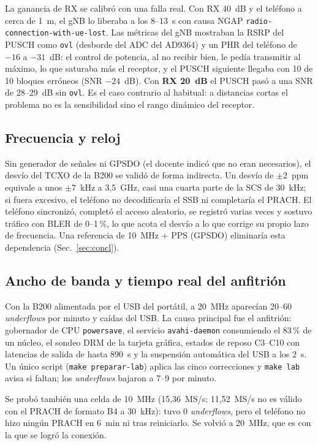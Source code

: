 \documentclass[conference]{IEEEtran}
\begin{document}
La ganancia de RX se calibró con una falla real. Con RX 40~dB y el teléfono a cerca de 1~m, el gNB lo liberaba a los 8--13~s con causa NGAP \texttt{radio-connection-with-ue-lost}. Las métricas del gNB mostraban la RSRP del PUSCH como \texttt{ovl} (desborde del ADC del AD9364) y un PHR del teléfono de $-16$ a $-31$~dB: el control de potencia, al no recibir bien, le pedía transmitir al máximo, lo que saturaba más el receptor, y el PUSCH siguiente llegaba con 10 de 10 bloques erróneos (SNR $-24$~dB). Con \textbf{RX 20~dB} el PUSCH pasó a una SNR de 28--29~dB sin \texttt{ovl}. Es el caso contrario al habitual: a distancias cortas el problema no es la sensibilidad sino el rango dinámico del receptor.

\subsection{Frecuencia y reloj}
Sin generador de señales ni GPSDO (el docente indicó que no eran necesarios), el desvío del TCXO de la B200 se validó de forma indirecta. Un desvío de $\pm 2$~ppm equivale a unos $\pm 7$~kHz a 3{,}5~GHz, casi una cuarta parte de la SCS de 30~kHz; si fuera excesivo, el teléfono no decodificaría el SSB ni completaría el PRACH. El teléfono sincronizó, completó el acceso aleatorio, se registró varias veces y sostuvo tráfico con BLER de 0--1\,\%, lo que acota el desvío a lo que corrige su propio lazo de frecuencia. Una referencia de 10~MHz + PPS (GPSDO) eliminaría esta dependencia (Sec.~\ref{sec:concl}).

\subsection{Ancho de banda y tiempo real del anfitrión}
Con la B200 alimentada por el USB del portátil, a 20~MHz aparecían 20--60 \textit{underflows} por minuto y caídas del USB. La causa principal fue el anfitrión: gobernador de CPU \texttt{powersave}, el servicio \texttt{avahi-daemon} consumiendo el 83\,\% de un núcleo, el sondeo DRM de la tarjeta gráfica, estados de reposo C3--C10 con latencias de salida de hasta 890~\textmu s y la suspensión automática del USB a los 2~s. Un único script (\texttt{make preparar-lab}) aplica las cinco correcciones y \texttt{make lab} avisa si faltan; los \textit{underflows} bajaron a 7--9 por minuto.

Se probó también una celda de 10~MHz (15{,}36~MS/s; 11{,}52~MS/s no es válido con el PRACH de formato B4 a 30~kHz): tuvo 0 \textit{underflows}, pero el teléfono no hizo ningún PRACH en 6~min ni tras reiniciarlo. Se volvió a 20~MHz, que es con la que se logró la conexión.
\end{document}
